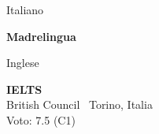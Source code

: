 \begin{minipage}{.3\textwidth}
	\flushright Italiano \faLanguage
\end{minipage}
\hfill
\begin{minipage}{.65\textwidth}
	\vfill
	{\large \textbf{Madrelingua}} 
	\vfill
\end{minipage}

\bigskip

\begin{minipage}{.3\textwidth}
	\flushright Inglese \faLanguage
\end{minipage}
\hfill
\begin{minipage}{.64\textwidth}
	\vfill
	{\large \textbf{IELTS}} \\
	\color{Maroon} British Council \hfill \color{Sepia} \faMapMarker \ Torino, Italia \\
	\color{gray} Voto: 7.5 (C1)
	\vfill
\end{minipage}